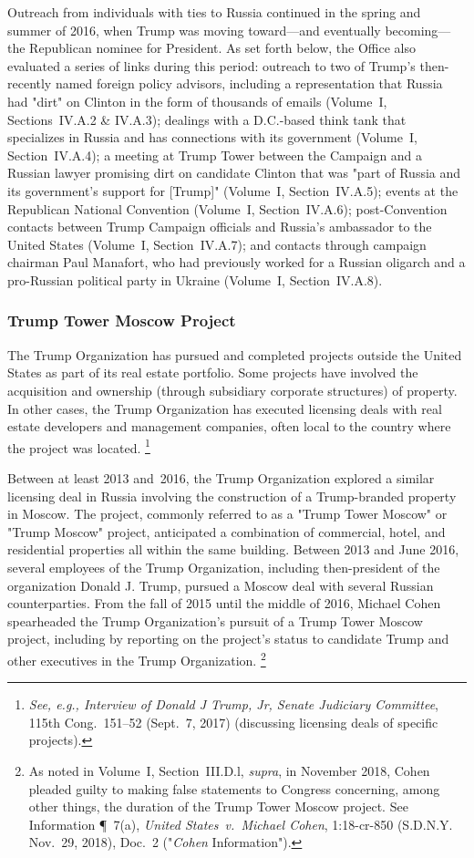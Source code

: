 Outreach from individuals with ties to Russia continued in the spring and summer of 2016, when Trump was moving toward---and eventually becoming---the Republican nominee for President.
As set forth below, the Office also evaluated a series of links during this period: outreach to two of Trump's then-recently named foreign policy advisors, including a representation that Russia had "dirt" on Clinton in the form of thousands of emails (Volume~I, Sections~IV.A.2 \& IV.A.3);
dealings with a D.C.-based think tank that specializes in Russia and has connections with its government (Volume~I, Section~IV.A.4);
a meeting at Trump Tower between the Campaign and a Russian lawyer promising dirt on candidate Clinton that was "part of Russia and its government's support for [Trump]" (Volume~I, Section~IV.A.5);
events at the Republican National Convention (Volume~I, Section~IV.A.6);
post-Convention contacts between Trump Campaign officials and Russia's ambassador to the United States (Volume~I, Section~IV.A.7);
and contacts through campaign chairman Paul Manafort, who had previously worked for a Russian oligarch and a pro-Russian political party in Ukraine (Volume~I, Section~IV.A.8).

\subsubsection{Trump Tower Moscow Project}

The Trump Organization has pursued and completed projects outside the United States as part of its real estate portfolio.
Some projects have involved the acquisition and ownership (through subsidiary corporate structures) of property.
In other cases, the Trump Organization has executed licensing deals with real estate developers and management companies, often local to the country where the project was located.%
\footnote{\textit{See, e.g., Interview of Donald J Trump, Jr, Senate Judiciary Committee}, 115th Cong.~151--52 (Sept.~7, 2017) (discussing licensing deals of specific projects).}

Between at least 2013 and~2016, the Trump Organization explored a similar licensing deal in Russia involving the construction of a Trump-branded property in Moscow.
The project, commonly referred to as a "Trump Tower Moscow" or "Trump Moscow" project, anticipated a combination of commercial, hotel, and residential properties all within the same building.
Between 2013 and June 2016, several employees of the Trump Organization, including then-president of the organization Donald J. Trump, pursued a Moscow deal with several Russian counterparties.
From the fall of 2015 until the middle of 2016, Michael Cohen spearheaded the Trump Organization's pursuit of a Trump Tower Moscow project, including by reporting on the project's status to candidate Trump and other executives in the Trump Organization.%
\footnote{As noted in Volume~I, Section~III.D.l, \textit{supra}, in November 2018, Cohen pleaded guilty to making false statements to Congress concerning, among other things, the duration of the Trump Tower Moscow project.
See Information \P~7(a), \textit{United States~v.\ Michael Cohen}, 1:18-cr-850 (S.D.N.Y. Nov.~29, 2018), Doc.~2 ("\textit{Cohen} Information").}

